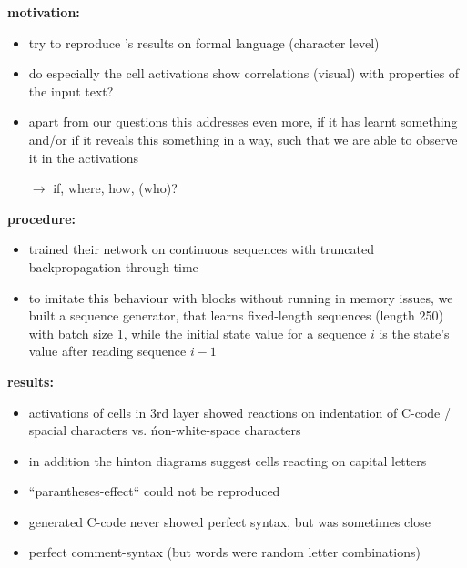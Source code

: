 \begin{frame}{\expii}
	\textbf{motivation:}
	\begin{itemize}
		\item try to reproduce \citeauthor{karpathy2015visualizing}'s results on formal language (character level)
		\item do especially the cell activations show correlations (visual) with properties of the input text?
		\item apart from our questions this addresses even more, if it has learnt something and/or if it reveals this something in a way, such that we are able to observe it in the activations

		\vspace{1em}
		$\rightarrow$ if, where, how, (who)?
	\end{itemize}
\end{frame}
\begin{frame}{\expii}
	\textbf{procedure:}
	\begin{itemize}
		\item \citet{karpathy2015visualizing} trained their network on continuous sequences with truncated backpropagation through time 
		\item to imitate this behaviour with blocks without running in memory issues, we built a sequence generator, that learns fixed-length sequences (length 250) with batch size 1, while the initial state value for a sequence $i$ is the state's value after reading sequence $i-1$
	\end{itemize}
\end{frame}
\begin{frame}{\expii}
	\textbf{results:}
	\begin{itemize}
		\item activations of cells in 3rd layer showed reactions on indentation of C-code / spacial characters vs. ńon-white-space characters
		\item in addition the hinton diagrams suggest cells reacting on capital letters
		\item “parantheses-effect“ could not be reproduced
		\item generated C-code never showed perfect syntax, but was sometimes close
		\item perfect comment-syntax (but words were random letter combinations)
	\end{itemize}
\end{frame}
